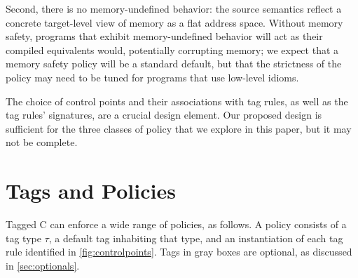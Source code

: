 \documentclass{llncs}
\begin{document}
Second, there is no memory-undefined behavior: the source semantics reflect a
concrete target-level view of memory as a flat address space. Without memory safety, programs
that exhibit memory-undefined behavior will act as their compiled equivalents would, potentially
corrupting memory; we expect that a memory safety policy will be a standard default, but that the
strictness of the policy may need to be tuned for programs that use low-level idioms.

The choice of control points and their associations with tag rules, as well as the tag rules'
signatures, are a crucial design element. Our proposed design is sufficient for the three classes of
policy that we explore in this paper, but it may not be complete.

\section{Tags and Policies}
\label{sec:policies}

Tagged C can enforce a wide range of policies, as follows.
A policy consists of a tag type \(\tau\), a default tag inhabiting that type, and an instantiation
of each tag rule identified in \cref{fig:controlpoints}. Tags in gray boxes are optional, as discussed
in \cref{sec:optionals}.
\end{document}
